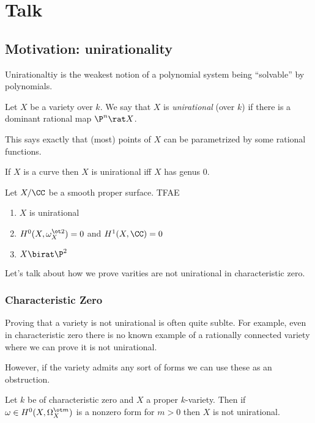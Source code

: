 \documentclass[12pt]{article}
\begin{document}
\tableofcontents

\section{Talk}

\subsection{Motivation: unirationality}

Unirationaltiy is the weakest notion of a polynomial system being ``solvable'' by polynomials. 

\begin{defn}
Let $X$ be a variety over $k$. We say that $X$ is \textit{unirational} (over $k$) if there is a dominant rational map $\P^n \rat X$.
\end{defn}

This says exactly that (most) points of $X$ can be parametrized by some rational functions. 

\begin{theorem}[Luroth]
If $X$ is a curve then $X$ is unirational iff $X$ has genus $0$.
\end{theorem}

\begin{theorem}[Castellunovo]
Let $X / \CC$ be a smooth proper surface. TFAE
\begin{enumerate}
\item $X$ is unirational
\item $H^0(X, \omega_X^{\ot 2}) = 0$ and $H^1(X, \CC) = 0$
\item $X \birat \P^2$
\end{enumerate}
\end{theorem}

Let's talk about how we prove varities are not unirational in characteristic zero.

\subsubsection{Characteristic Zero}

Proving that a variety is not unirational is often quite sublte. For example, even in characteristic zero there is no known example of a rationally connected variety where we can prove it is not unirational.
\par 
However, if the variety admits any sort of forms we can use these as an obstruction.

\begin{prop}
Let $k$ be of characteristic zero and $X$ a proper $k$-variety. Then if $\omega \in H^0(X, \Omega_X^{\ot m})$ is a nonzero form for $m > 0$ then $X$ is not unirational.
\end{prop}
\end{document}
